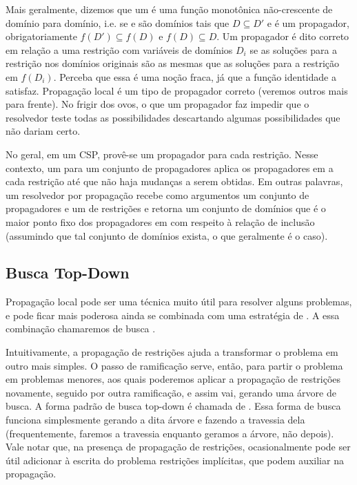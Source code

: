Mais geralmente, dizemos que um  é uma função monotônica não-crescente de domínio para
domínio, i.e. se  e  são domínios tais que $D \subseteq D'$ e 
é um propagador, obrigatoriamente $f(D') \subseteq f(D)$ e $f(D) \subseteq D$. Um propagador é dito
correto em relação a uma restrição  com variáveis de domínios $D_i$ se as soluções para
a restrição nos domínios originais são as mesmas que as soluções para a restrição em $f(D_i)$.
Perceba que essa é uma noção fraca, já que a função identidade a satisfaz. Propagação local é um
tipo de propagador correto (veremos outros mais para frente). No frigir dos ovos, o que um
propagador faz impedir que o resolvedor teste todas as possibilidades descartando algumas possibilidades que não dariam certo.

No geral, em um CSP, provê-se um propagador para cada restrição. Nesse contexto, um  para um conjunto de propagadores  aplica os propagadores em  a
cada restrição até que não haja mudanças a serem obtidas. Em outras palavras, um resolvedor
 por propagação recebe como argumentos um conjunto de propagadores  e um
de restrições  e retorna um conjunto de domínios que é o maior ponto fixo dos
propagadores em  com respeito à relação de inclusão (assumindo que tal conjunto de
domínios exista, o que geralmente é o caso).

\subsection{Busca Top-Down}

Propagação local pode ser uma técnica muito útil para resolver alguns problemas, e pode ficar mais poderosa ainda se combinada com uma estratégia de . A essa combinação chamaremos de busca .

Intuitivamente, a propagação de restrições ajuda a transformar o problema em outro mais simples. O passo de ramificação serve, então, para partir o problema em problemas menores, aos quais poderemos aplicar a propagação de restrições novamente, seguido por outra ramificação, e assim vai, gerando uma árvore de busca. A forma padrão de busca top-down é chamada de . Essa forma de busca funciona simplesmente
gerando a dita árvore e fazendo a travessia dela (frequentemente, faremos a travessia enquanto geramos a árvore, não depois). Vale notar que, na presença de propagação de restrições, ocasionalmente pode ser útil adicionar à escrita do problema restrições implícitas, que podem auxiliar na propagação.

